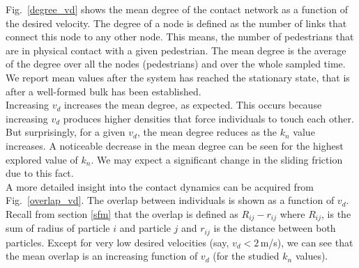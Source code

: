 \documentclass[preprint,12pt]{elsarticle}
\begin{document}
Fig.~\ref{degree_vd} shows the mean degree of the contact network as a function of the desired velocity. The degree of a node is defined as the number of links that connect this node to any other node. This means, the number of pedestrians that are in physical contact with a given pedestrian. The mean degree is the average of the degree over all the nodes (pedestrians) and over the whole sampled time. We report mean values after the system has reached the stationary state, that is after a well-formed bulk has been established.\\

Increasing $v_d$ increases the mean degree, as expected. This occurs because increasing $v_d$ produces higher densities that force individuals to touch each other. But surprisingly, for a given $v_d$, the mean degree reduces as the $k_n$ value increases. A noticeable decrease in the mean degree can be seen for the highest explored value of $k_n$. We may expect a significant change in the sliding friction due to this fact.\\

A more detailed insight into the contact dynamics can be acquired from Fig.~\ref{overlap_vd}. The overlap between individuals is shown as a function of $v_d$. Recall from section \ref{sfm} that the overlap is defined as $R_{ij}-r_{ij}$ where $R_{ij}$, is the sum of radius of particle $i$ and particle $j$ and $r_{ij}$  is the distance between both particles. Except for very low desired velocities (say, $v_d<2\,$m/s), we can see that the mean overlap is an increasing function of $v_d$ (for the studied $k_n$ values).\\

\end{document}
